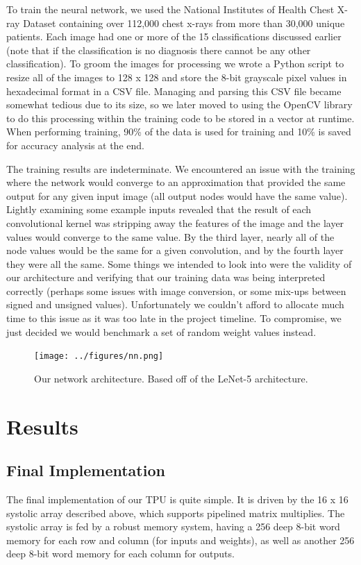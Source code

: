 \documentclass[11pt, conference, onecolumn]{IEEEtran}
\begin{document}
    To train the neural network, we used the National Institutes of Health Chest X-ray
    Dataset \cite{b6} containing over 112,000 chest x-rays from more than 30,000 unique patients.
    Each image had one or more of the 15 classifications discussed earlier (note that if
    the classification is no diagnosis there cannot be any other classification). To groom
    the images for processing we wrote a Python script to resize all of the images to
    128 x 128 and store the 8-bit grayscale pixel values in hexadecimal format in a CSV
    file. Managing and parsing this CSV file became somewhat tedious due to its size, so
    we later moved to using the OpenCV library to do this processing within the training
    code to be stored in a vector at runtime. When performing training, 90\% of the data
    is used for training and 10\% is saved for accuracy analysis at the end.

    The training results are indeterminate. We encountered an issue with the training
    where the network would converge to an approximation that provided the same output for
    any given input image (all output nodes would have the same value). Lightly examining
    some example inputs revealed that the result of each convolutional kernel was
    stripping away the features of the image and the layer values would converge to the
    same value. By the third layer, nearly all of the node values would be the same for a
    given convolution, and by the fourth layer they were all the same. Some things we
    intended to look into were the validity of our architecture and verifying that our
    training data was being interpreted correctly (perhaps some issues with image
    conversion, or some mix-ups between signed and unsigned values). Unfortunately we
    couldn’t afford to allocate much time to this issue as it was too late in the project
    timeline. To compromise, we just decided we would benchmark a set of random weight
    values instead.

    \begin{figure}[htbp]
        \centering
        \texttt{[image: ../figures/nn.png]}
        \caption{Our network architecture. Based off of the LeNet-5 architecture.}
    \end{figure}


\section{Results}
    \subsection{Final Implementation}
        The final implementation of our TPU is quite simple. It is driven by the 16 x 16
        systolic array described above, which supports pipelined matrix multiplies. The
        systolic array is fed by a robust memory system, having a 256 deep 8-bit word
        memory for each row and column (for inputs and weights), as well as another 256
        deep 8-bit word memory for each column for outputs.
\end{document}
